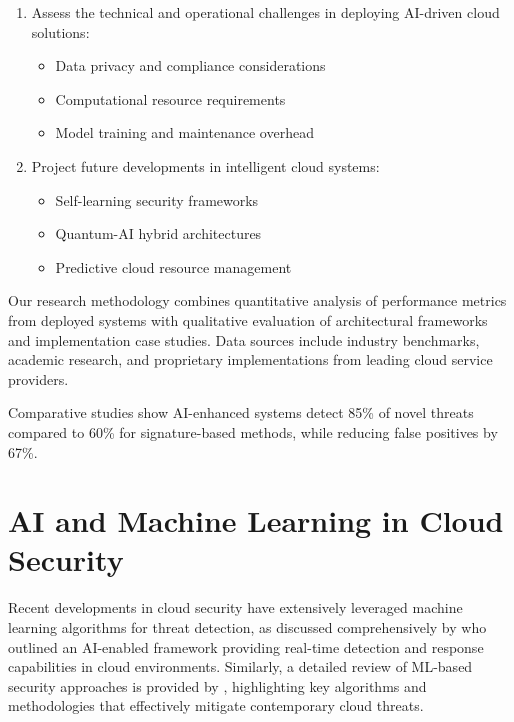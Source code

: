 \documentclass[a4paper,12pt]{article}
\begin{document}
\begin{enumerate}
    \item Assess the technical and operational challenges in deploying AI-driven cloud solutions:
          \begin{itemize}
              \item Data privacy and compliance considerations
              \item Computational resource requirements
              \item Model training and maintenance overhead
          \end{itemize}
    \item Project future developments in intelligent cloud systems:
          \begin{itemize}
              \item Self-learning security frameworks
              \item Quantum-AI hybrid architectures
              \item Predictive cloud resource management
          \end{itemize}
\end{enumerate}

Our research methodology combines quantitative analysis of performance metrics from deployed systems with qualitative evaluation of architectural frameworks and implementation case studies. Data sources include industry benchmarks, academic research, and proprietary implementations from leading cloud service providers.

Comparative studies show AI-enhanced systems detect 85\% of novel threats compared to 60\% for signature-based methods, while reducing false positives by 67\%.

\section{AI and Machine Learning in Cloud Security}
Recent developments in cloud security have extensively leveraged machine learning algorithms for threat detection, as discussed comprehensively by \citet{farzaan2025aienabledefficienteffectivecyber} who outlined an AI-enabled framework providing real-time detection and response capabilities in cloud environments. Similarly, a detailed review of ML-based security approaches is provided by \citet{babaei2023reviewmachinelearningbasedsecurity}, highlighting key algorithms and methodologies that effectively mitigate contemporary cloud threats.
\end{document}
